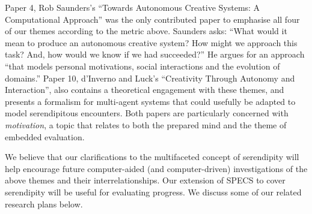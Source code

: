 \medskip



\bigskip

Paper 4, Rob Saunders's \citeyear{saunders2012towards} ``Towards
Autonomous Creative Systems: A Computational Approach'' was the only
contributed paper to emphasise all four of our themes according to the
metric above.  Saunders asks: ``What would it mean to produce an
autonomous creative system? How might we approach this task? And, how
would we know if we had succeeded?''  He argues for an approach ``that
models personal motivations, social interactions and the evolution of
domains.''  Paper 10, d'Inverno and Luck's \citeyear{d2012creativity}
``Creativity Through Autonomy and Interaction'', also contains a
theoretical engagement with these themes, and presents a formalism for
multi-agent systems that could usefully be adapted to model
serendipitous encounters.  Both papers are particularly concerned with
\emph{motivation}, a topic that relates to both the prepared mind and
the theme of embedded evaluation.

We believe that our clarifications to the multifaceted concept of
serendipity will help encourage future computer-aided (and
computer-driven) investigations of the above themes and their
interrelationships.  Our extension of SPECS to cover serendipity will
be useful for evaluating progress.  We discuss some of our related
research plans below.
